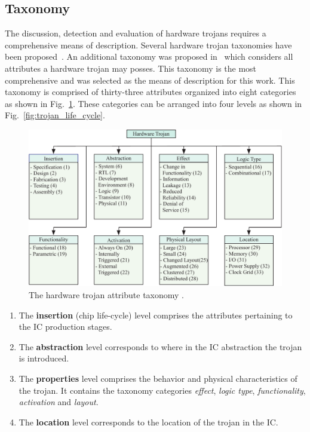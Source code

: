 \documentclass[conference]{IEEEtran}
\begin{document}
\subsection{Taxonomy} \label{sec:taxonomy}
The discussion, detection and evaluation of hardware trojans requires a comprehensive means of description.
Several hardware trojan taxonomies have been proposed~\cite{taxonomy1, taxonomy2, taxonomy3, taxonomy4}.
An additional taxonomy was proposed in~\cite{samerAttribute} which considers all attributes a hardware trojan may posses.
This taxonomy is the most comprehensive and was selected as the means of description for this work.
This taxonomy is comprised of thirty-three attributes organized into eight categories as shown in Fig.~\ref{fig:HW_trojan}.
These categories can be arranged into four levels as shown in Fig.~\ref{fig:trojan_life_cycle}.
\begin{figure}[]
	\centering
	\includegraphics[width=0.7\linewidth]{../Thesis/Figures/HW_trojan}
	\caption{The hardware trojan attribute taxonomy \cite{samerAttribute}.}
	\label{fig:HW_trojan}
\end{figure}
\begin{enumerate}
	\item The \textbf{insertion} (chip life-cycle) level comprises the attributes pertaining to the IC production stages.
	\item The \textbf{abstraction} level corresponds to where in the IC abstraction the trojan is introduced.
	\item The \textbf{properties} level comprises the behavior and physical characteristics of the trojan.
	It contains the taxonomy categories \textit{effect}, \textit{logic type}, \textit{functionality}, \textit{activation} and \textit{layout}.
	\item The \textbf{location} level corresponds to the location of the trojan in the IC.
\end{enumerate}
\end{document}
